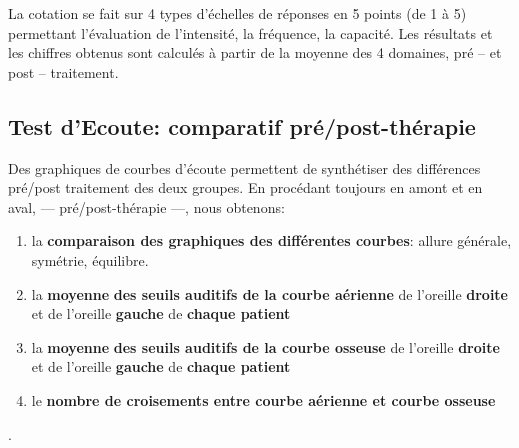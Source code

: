 La cotation se fait sur 4 types d'échelles de réponses en 5 points (de 1 à 5)
permettant l'évaluation de l'intensité, la fréquence, la capacité.
Les résultats et les chiffres obtenus  sont calculés à partir de la moyenne des 4
domaines, pré -- et post -- traitement.

\subsection{Test d'Ecoute: comparatif pré/post-thérapie }

Des graphiques de courbes d'écoute permettent  de synthétiser des différences pré/post traitement des 
deux groupes. %
En procédant toujours en amont et en aval, --- pré/post-thérapie ---, nous
obtenons:

	


\begin{enumerate}
		\item la \textbf{comparaison des graphiques des différentes courbes}: allure générale, symétrie, 
		équilibre.
	\item la \textbf{moyenne} \textbf{des seuils
		auditifs de la courbe aérienne} de l'oreille \textbf{droite} et de
	l'oreille \textbf{gauche} de \textbf{chaque patient}
	\item la \textbf{moyenne} \textbf{des seuils
		auditifs de la courbe osseuse} de l'oreille \textbf{droite} et de
	l'oreille \textbf{gauche} de \textbf{chaque patient}

	\item le \textbf{nombre de croisements entre courbe aérienne et courbe osseuse}
\end{enumerate}.
